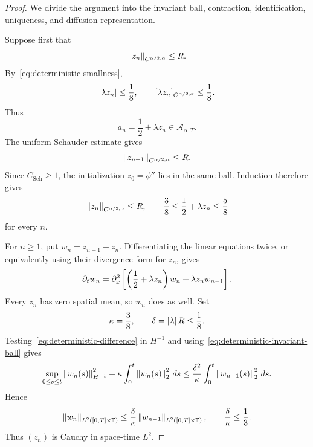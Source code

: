 \begin{proof}
We divide the argument into the invariant ball, contraction, identification, uniqueness, and diffusion representation.

Suppose first that
\begin{equation*}
  \left\lVert z_n\right\rVert_{C^{\alpha/2,\alpha}}\leq R.
\end{equation*}
By~\eqref{eq:deterministic-smallness},
\begin{equation*}
  \left|\lambda z_n\right|\leq\frac18,
  \qquad
  [\lambda z_n]_{C^{\alpha/2,\alpha}}\leq\frac18.
\end{equation*}
Thus
\begin{equation*}
  a_n=\frac12+\lambda z_n
  \in\mathcal A_{\alpha,T}.
\end{equation*}
The uniform Schauder estimate gives
\begin{equation*}
  \left\lVert z_{n+1}\right\rVert_{C^{\alpha/2,\alpha}}
  \leq R.
\end{equation*}
Since $C_{\mathrm{Sch}}\geq1$, the initialization $z_0=\phi''$ lies in the same ball. Induction therefore gives
\begin{equation}
  \left\lVert z_n\right\rVert_{C^{\alpha/2,\alpha}}
  \leq R,
  \qquad
  \frac38\leq\frac12+\lambda z_n\leq\frac58
  \label{eq:deterministic-invariant-ball}
\end{equation}
for every $n$.

For $n\geq1$, put $w_n=z_{n+1}-z_n$. Differentiating the linear equations twice, or equivalently using their divergence form for $z_n$, gives
\begin{equation}
  \partial_tw_n
  =
  \partial_x^2\left[
    \left(\frac12+\lambda z_n\right)w_n
    +\lambda z_nw_{n-1}
  \right].
  \label{eq:deterministic-difference}
\end{equation}
Every $z_n$ has zero spatial mean, so $w_n$ does as well. Set
\begin{equation*}
  \kappa=\frac38,
  \qquad
  \delta=\left|\lambda\right| R\leq\frac18.
\end{equation*}
Testing~\eqref{eq:deterministic-difference} in $H^{-1}$ and using~\eqref{eq:deterministic-invariant-ball} gives
\begin{equation}
  \sup_{0\leq s\leq t}
  \left\lVert w_n(s)\right\rVert_{H^{-1}}^2
  +\kappa\int_0^t\left\lVert w_n(s)\right\rVert_2^2\,ds
  \leq
  \frac{\delta^2}{\kappa}
  \int_0^t\left\lVert w_{n-1}(s)\right\rVert_2^2\,ds.
  \label{eq:Hminus1-contraction-manuscript}
\end{equation}
Hence
\begin{equation*}
  \left\lVert w_n\right\rVert_{L^2([0,T]\times\mathbb T)}
  \leq
  \frac\delta\kappa
  \left\lVert w_{n-1}\right\rVert_{L^2([0,T]\times\mathbb T)},
  \qquad
  \frac\delta\kappa\leq\frac13.
\end{equation*}
Thus $(z_n)$ is Cauchy in space-time $L^2$.


\end{proof}
